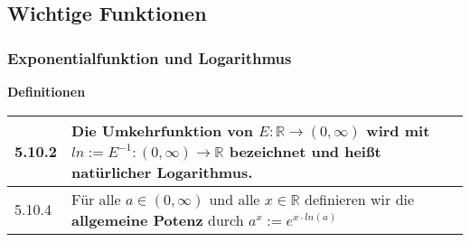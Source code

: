 \begin{table}[H]
\begin{tabularx}{\textwidth}{X m{16cm}}
        \bottomrule
    \end{tabularx}
    \end{table}

    \pagebreak

\subsection{Wichtige Funktionen}
\subsubsection{Exponentialfunktion und Logarithmus}
    \noindent
    \textbf{Definitionen}
    \begin{table}[H]  
    \begin{tabularx}{\textwidth}{X m{16cm}}
        \toprule

        5.10.2& Die Umkehrfunktion von $E: \mathbb{R} \rightarrow (0, \infty)$ wird mit $ln := E^{-1}: (0,\infty) \rightarrow \mathbb{R}$
                bezeichnet und heißt \textbf{natürlicher Logarithmus}. \\
        \midrule
        5.10.4& Für alle $a \in (0, \infty)$ und alle $x \in \mathbb{R}$ definieren wir die \textbf{allgemeine Potenz} durch $a^x := e^{x\cdot ln(a)}$ \\   

        \bottomrule

    \end{tabularx}
    \end{table}

